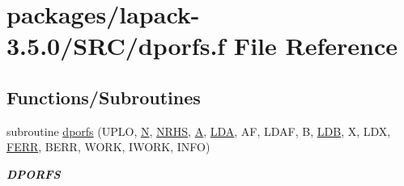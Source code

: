 \hypertarget{dporfs_8f}{}\section{packages/lapack-\/3.5.0/\+S\+R\+C/dporfs.f File Reference}
\label{dporfs_8f}
\subsection*{Functions/\+Subroutines}
\begin{DoxyCompactItemize}
\item 
subroutine \hyperlink{group__doublePOcomputational_ga12e83769d4dadac84d9c1509f802efa4}{dporfs} (U\+P\+L\+O, \hyperlink{polmisc_8c_a0240ac851181b84ac374872dc5434ee4}{N}, \hyperlink{example__user_8c_aa0138da002ce2a90360df2f521eb3198}{N\+R\+H\+S}, \hyperlink{classA}{A}, \hyperlink{example__user_8c_ae946da542ce0db94dced19b2ecefd1aa}{L\+D\+A}, A\+F, L\+D\+A\+F, B, \hyperlink{example__user_8c_a50e90a7104df172b5a89a06c47fcca04}{L\+D\+B}, X, L\+D\+X, \hyperlink{superlu__enum__consts_8h_af00a42ecad444bbda75cde1b64bd7e72a78fd14d7abebae04095cfbe02928f153}{F\+E\+R\+R}, B\+E\+R\+R, W\+O\+R\+K, I\+W\+O\+R\+K, I\+N\+F\+O)
\begin{DoxyCompactList}\small\item\em {\bfseries D\+P\+O\+R\+F\+S} \end{DoxyCompactList}\end{DoxyCompactItemize}
